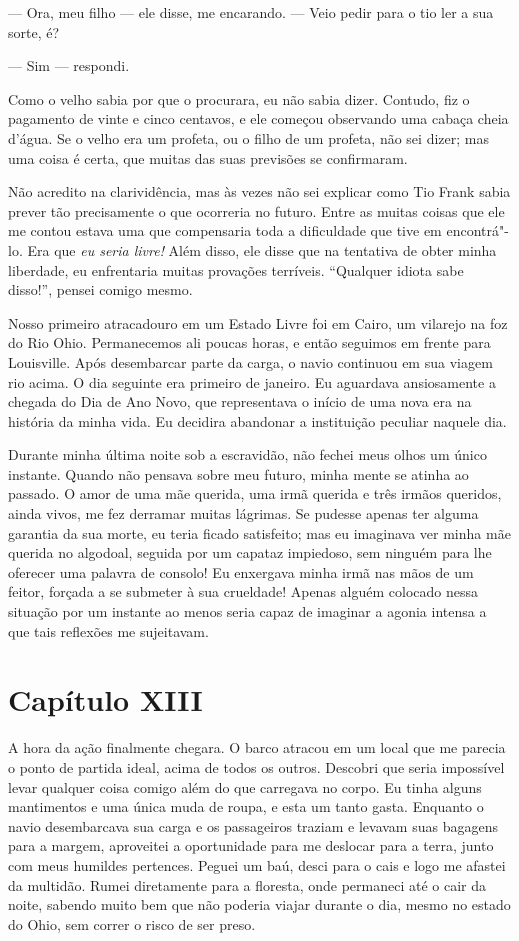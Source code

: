 --- Ora, meu filho --- ele disse, me encarando. --- Veio pedir para o tio
ler a sua sorte, é?

--- Sim --- respondi.

Como o velho sabia por que o procurara, eu não sabia dizer. Contudo, fiz
o pagamento de vinte e cinco centavos, e ele começou observando uma
cabaça cheia d'água. Se o velho era um profeta, ou o filho de um
profeta, não sei dizer; mas uma coisa é certa, que muitas das suas
previsões se confirmaram.

Não acredito na clarividência, mas às vezes não sei explicar como Tio
Frank sabia prever tão precisamente o que ocorreria no futuro. Entre as
muitas coisas que ele me contou estava uma que compensaria toda a
dificuldade que tive em encontrá"-lo. Era que \emph{eu seria livre!} Além
disso, ele disse que na tentativa de obter minha liberdade, eu
enfrentaria muitas provações terríveis. ``Qualquer idiota sabe disso!'',
pensei comigo mesmo.

Nosso primeiro atracadouro em um Estado Livre foi em Cairo, um vilarejo
na foz do Rio Ohio. Permanecemos ali poucas horas, e então seguimos em
frente para Louisville. Após desembarcar parte da carga, o navio
continuou em sua viagem rio acima. O dia seguinte era primeiro de
janeiro. Eu aguardava ansiosamente a chegada do Dia de Ano Novo, que
representava o início de uma nova era na história da minha vida. Eu
decidira abandonar a instituição peculiar naquele dia.

Durante minha última noite sob a escravidão, não fechei meus olhos um
único instante. Quando não pensava sobre meu futuro, minha mente se
atinha ao passado. O amor de uma mãe querida, uma irmã querida e três
irmãos queridos, ainda vivos, me fez derramar muitas lágrimas. Se
pudesse apenas ter alguma garantia da sua morte, eu teria ficado
satisfeito; mas eu imaginava ver minha mãe querida no algodoal, seguida
por um capataz impiedoso, sem ninguém para lhe oferecer uma palavra de
consolo! Eu enxergava minha irmã nas mãos de um feitor, forçada a se
submeter à sua crueldade! Apenas alguém colocado nessa situação por um
instante ao menos seria capaz de imaginar a agonia intensa a que tais
reflexões me sujeitavam.

\chapter{Capítulo XIII}

A hora da ação finalmente chegara. O barco atracou em um local que me
parecia o ponto de partida ideal, acima de todos os outros. Descobri que
seria impossível levar qualquer coisa comigo além do que carregava no
corpo. Eu tinha alguns mantimentos e uma única muda de roupa, e esta um
tanto gasta. Enquanto o navio desembarcava sua carga e os passageiros
traziam e levavam suas bagagens para a margem, aproveitei a oportunidade
para me deslocar para a terra, junto com meus humildes pertences. Peguei
um baú, desci para o cais e logo me afastei da multidão. Rumei
diretamente para a floresta, onde permaneci até o cair da noite, sabendo
muito bem que não poderia viajar durante o dia, mesmo no estado do Ohio,
sem correr o risco de ser preso.

